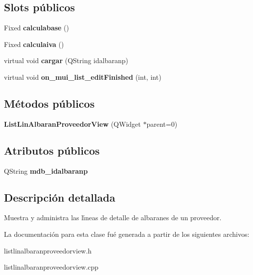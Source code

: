 \subsection*{Slots p\'{u}blicos}
\begin{CompactItemize}
\item 
Fixed {\bf calculabase} ()\label{classListLinAlbaranProveedorView_i0}

\item 
Fixed {\bf calculaiva} ()\label{classListLinAlbaranProveedorView_i1}

\item 
virtual void {\bf cargar} (QString idalbaranp)\label{classListLinAlbaranProveedorView_i2}

\item 
virtual void {\bf on\_\-mui\_\-list\_\-edit\-Finished} (int, int)\label{classListLinAlbaranProveedorView_i3}

\end{CompactItemize}
\subsection*{M\'{e}todos p\'{u}blicos}
\begin{CompactItemize}
\item 
{\bf List\-Lin\-Albaran\-Proveedor\-View} (QWidget $\ast$parent=0)\label{classListLinAlbaranProveedorView_a0}

\end{CompactItemize}
\subsection*{Atributos p\'{u}blicos}
\begin{CompactItemize}
\item 
QString {\bf mdb\_\-idalbaranp}\label{classListLinAlbaranProveedorView_o0}

\end{CompactItemize}


\subsection{Descripci\'{o}n detallada}
Muestra y administra las l\'{\i}neas de detalle de albaranes de un proveedor. 



La documentaci\'{o}n para esta clase fu\'{e} generada a partir de los siguientes archivos:\begin{CompactItemize}
\item 
listlinalbaranproveedorview.h\item 
listlinalbaranproveedorview.cpp\end{CompactItemize}
